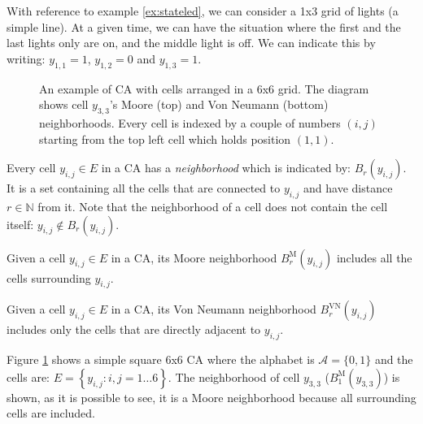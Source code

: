 \begin{example}
\label{ex:stateled2}
With reference to example \ref{ex:stateled}, we can consider a 1x3 grid of lights (a simple line).
At a given time, we can have the situation where the first and the last lights only are on, and
the middle light is off. We can indicate this by writing: $y_{1,1}=1$, $y_{1,2}=0$ and $y_{1,3}=1$. 
\end{example}

%
\begin{figure}[b]

\caption[An example of a 6x6 CA.]{An
example of CA with cells arranged in a 6x6 grid. The diagram shows cell $y_{3,3}$'s
Moore (top) and Von Neumann (bottom) neighborhoods.
Every cell is indexed by a couple of numbers $(i,j)$ starting
from the top left cell which holds position $(1,1)$.}
\label{fig:exampleca}
\end{figure}
%

\begin{definition}[Neighborhood]
\label{def:neigh}
Every cell $y_{i,j} \in E$ in a CA has a \textit{neighborhood} which is indicated by: 
$B_r\left( y_{i,j} \right)$. It is a set containing all the cells that are connected to
$y_{i,j}$ and have distance $r \in \mathbb{N}$ from it. Note that the neighborhood of a cell does
not contain the cell itself: $y_{i,j} \not\in B_r\left( y_{i,j} \right)$.
\end{definition}

\begin{definition}
\label{def:neighmoore}
Given a cell $y_{i,j} \in E$ in a CA, its Moore neighborhood $B^\text{M}_r\left( y_{i,j} \right)$
includes all the cells surrounding
$y_{i,j}$.
\end{definition}

\begin{definition}
\label{def:neighmoore}
Given a cell $y_{i,j} \in E$ in a CA, its Von Neumann neighborhood $B^\text{VN}_r\left( y_{i,j} \right)$
includes only the cells that are
directly adjacent to $y_{i,j}$.
\end{definition}

\begin{example}
\label{ex:simpleca}
Figure \ref{fig:exampleca} shows a simple square 6x6 CA
where the alphabet is $\mathcal{A}=\{ 0, 1 \}$ and the
cells are: $E = \left\{ y_{i,j} : i,j = 1 \dots 6 \right\}$. The neighborhood of cell $y_{3,3}$
($B^\text{M}_1\left( y_{3,3} \right)$)
is shown, as it is possible to see, it is a Moore neighborhood because all surrounding cells are
included.
\end{example}

